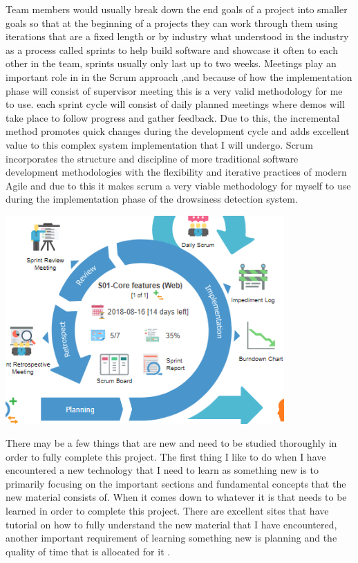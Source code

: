 Team members would usually break down the end goals of a project into smaller goals so that at the beginning  of a projects they can work through them using iterations that are a  fixed length or by industry  what understood in the industry as a process called sprints to help build software and showcase it often to each other in the team, sprints usually only last  up to two weeks. Meetings play an important role in  in the Scrum approach ,and because of how the implementation phase will consist of supervisor meeting this is a very valid methodology for me to use. each sprint cycle will consist of daily planned  meetings where demos will take place to follow progress and gather feedback. Due to this, the incremental method promotes quick changes during the development cycle and adds excellent value to this complex system implementation that I will undergo. Scrum incorporates the structure and discipline of more traditional software development methodologies with the flexibility and iterative practices of modern Agile and due to this it makes scrum a very viable methodology for myself to use during the implementation phase of the drowsiness detection system.

\includegraphics[width=0.8\textwidth]{Figures/Scrumchart.png}

There may be a few things that are new and need to be studied thoroughly in order to fully complete this project.  The first thing I like to do when I have encountered a new technology that I need to learn  as something new is to primarily focusing on the important sections and fundamental concepts that the new material consists of.  When it comes down to whatever it is that needs to be learned in order to complete this project. There are excellent sites that have tutorial on how to fully understand the new material that I have encountered, another important requirement of learning something new is planning and the quality of time that is allocated for it .

